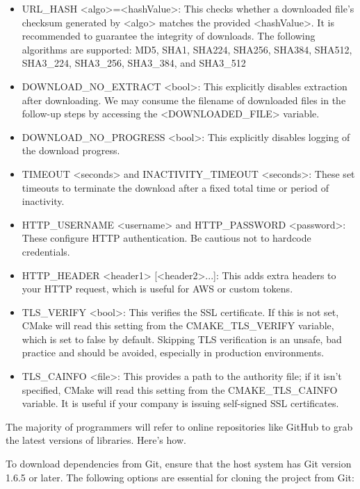 \begin{itemize}
\item
URL\_HASH <algo>=<hashValue>: This checks whether a downloaded file’s checksum generated by <algo> matches the provided <hashValue>. It is recommended to guarantee the integrity of downloads. The following algorithms are supported: MD5, SHA1, SHA224, SHA256, SHA384, SHA512, SHA3\_224, SHA3\_256, SHA3\_384, and SHA3\_512

\item
DOWNLOAD\_NO\_EXTRACT <bool>: This explicitly disables extraction after downloading. We may consume the filename of downloaded files in the follow-up steps by accessing the <DOWNLOADED\_FILE> variable.

\item
DOWNLOAD\_NO\_PROGRESS <bool>: This explicitly disables logging of the download progress.

\item
TIMEOUT <seconds> and INACTIVITY\_TIMEOUT <seconds>: These set timeouts to terminate the download after a fixed total time or period of inactivity.

\item
HTTP\_USERNAME <username> and HTTP\_PASSWORD <password>: These configure HTTP authentication. Be cautious not to hardcode credentials.

\item
HTTP\_HEADER <header1> [<header2>...]: This adds extra headers to your HTTP request, which is useful for AWS or custom tokens.

\item
TLS\_VERIFY <bool>: This verifies the SSL certificate. If this is not set, CMake will read this setting from the CMAKE\_TLS\_VERIFY variable, which is set to false by default. Skipping TLS verification is an unsafe, bad practice and should be avoided, especially in production environments.

\item
TLS\_CAINFO <file>: This provides a path to the authority file; if it isn’t specified, CMake will read this setting from the CMAKE\_TLS\_CAINFO variable. It is useful if your company is issuing self-signed SSL certificates.
\end{itemize}

The majority of programmers will refer to online repositories like GitHub to grab the latest versions of libraries. Here’s how.


To download dependencies from Git, ensure that the host system has Git version 1.6.5 or later. The following options are essential for cloning the project from Git:

